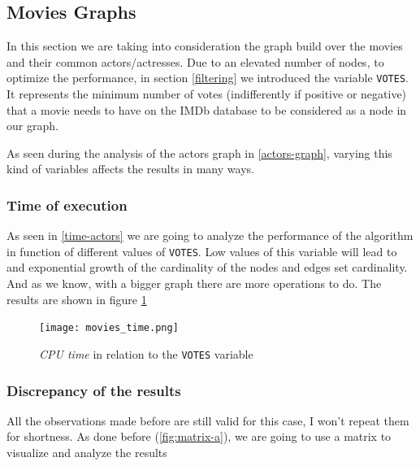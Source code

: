 \s
\newpage
\subsection{Movies Graphs}
In this section we are taking into consideration the graph build over the movies and their common actors/actresses. Due to an elevated number of nodes, to optimize the performance, in section \ref{filtering} we introduced the variable \texttt{VOTES}. It represents the minimum number of votes (indifferently if positive or negative) that a movie needs to have on the IMDb database to be considered as a node in our graph.

As seen during the analysis of the actors graph in \ref{actors-graph}, varying this kind of variables affects the results in many ways.

\subsubsection{Time of execution}

As seen in \ref{time-actors} we are going to analyze the performance of the algorithm in function of different values of \texttt{VOTES}. Low values of this variable will lead to and exponential growth of the cardinality of the nodes and edges set cardinality. And as we know, with a bigger graph there are more operations to do. The results are shown in figure \ref{fig:moves_time}

\begin{figure}[h!]
    \centering
    \texttt{[image: movies\_time.png]}
    \caption{\emph{CPU time} in relation to the \texttt{VOTES} variable}
    \label{fig:moves_time}
\end{figure}

\newpage


\subsubsection{Discrepancy of the results}

All the observations made before are still valid for this case, I won't repeat them for shortness. As done before (\ref{fig:matrix-a}), we are going to use a matrix to visualize and analyze the results
\s

% 

